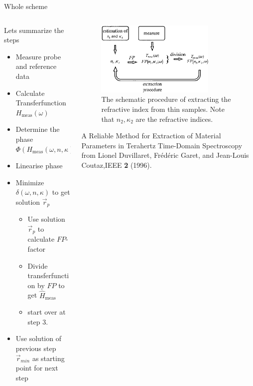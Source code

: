 \documentclass[aspectratio=1610, 9pt]{beamer}
\begin{document}
\begin{frame}{Whole scheme}
  \begin{columns}
    \begin{column}{0.5\textwidth}
      Lets summarize the steps
      \begin{itemize}
        \item[1.] Measure probe and reference data 
        \item[2.] Calculate Transferfunction $H_\text{meas}(\omega)$
        \item[3.] Determine the phase $\Phi(H_\text{meas}(\omega, n, \kappa))$
        \item[4.] Linearise phase
        \item[5.] Minimize $\delta(\omega, n, \kappa)$ to get solution $\vec{r}_p$
        \begin{itemize}
          \item[a)] Use solution $\vec{r}_p$ to calculate $FP$-factor 
          \item[b)] Divide transferfunction by $FP$ to get $\hat{H}_\text{meas}$
          \item[c)] start over at step 3. 
        \end{itemize}
        \item[6.] Use solution of previous step $\vec{r}_{min}$ as starting point for next step 
      \end{itemize}
    \end{column}
    \begin{column}{0.5\textwidth}
      \begin{figure}
        \includegraphics[width=0.8\textwidth]{images/procedure_fp.jpg}
        \caption{The schematic procedure of extracting the refractive index from thin samples. Note that $n_2, \kappa_2$ are the refractive indices.}
      \end{figure}
      \textcolor{tugreen}{A Reliable Method for Extraction of Material Parameters in Terahertz Time-Domain Spectroscopy} from Lionel Duvillaret, Frédéric Garet, and Jean-Louis Coutaz,IEEE \textbf{2} (1996).
  \end{column}
\end{columns}
\end{frame}
\end{document}
